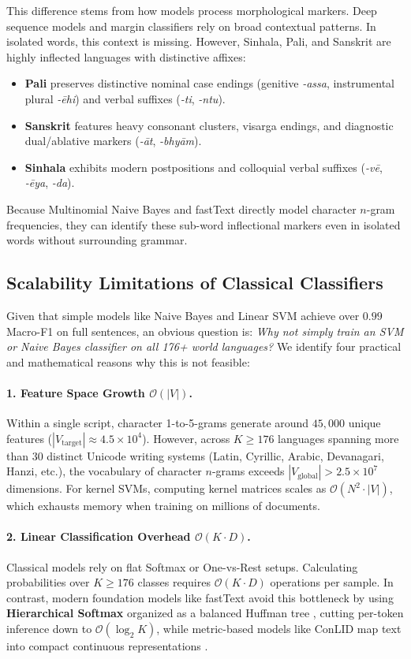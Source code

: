 \documentclass[11pt]{article}
\begin{document}
This difference stems from how models process morphological markers. Deep sequence models and margin classifiers rely on broad contextual patterns. In isolated words, this context is missing. However, Sinhala, Pali, and Sanskrit are highly inflected languages with distinctive affixes:
\begin{itemize}
    \item \textbf{Pali} preserves distinctive nominal case endings (genitive \textit{-assa}, instrumental plural \textit{-\={e}hi}) and verbal suffixes (\textit{-ti}, \textit{-ntu}).
    \item \textbf{Sanskrit} features heavy consonant clusters, visarga endings, and diagnostic dual/ablative markers (\textit{-\={a}t}, \textit{-bhy\={a}m}).
    \item \textbf{Sinhala} exhibits modern postpositions and colloquial verbal suffixes (\textit{-v\={e}}, \textit{-\={e}ya}, \textit{-da}).
\end{itemize}
Because Multinomial Naive Bayes and fastText directly model character $n$-gram frequencies, they can identify these sub-word inflectional markers even in isolated words without surrounding grammar.

\subsection{Scalability Limitations of Classical Classifiers}
Given that simple models like Naive Bayes and Linear SVM achieve over $0.99$ Macro-F1 on full sentences, an obvious question is: \textit{Why not simply train an SVM or Naive Bayes classifier on all 176+ world languages?} We identify four practical and mathematical reasons why this is not feasible:

\paragraph{1. Feature Space Growth $\mathcal{O}(|V|)$.}
Within a single script, character 1-to-5-grams generate around $45,000$ unique features ($|V_{\text{target}}| \approx 4.5 \times 10^4$). However, across $K \ge 176$ languages spanning more than 30 distinct Unicode writing systems (Latin, Cyrillic, Arabic, Devanagari, Hanzi, etc.), the vocabulary of character $n$-grams exceeds $|V_{\text{global}}| > 2.5 \times 10^7$ dimensions. For kernel SVMs, computing kernel matrices scales as $\mathcal{O}(N^2 \cdot |V|)$, which exhausts memory when training on millions of documents.

\paragraph{2. Linear Classification Overhead $\mathcal{O}(K \cdot D)$.}
Classical models rely on flat Softmax or One-vs-Rest setups. Calculating probabilities over $K \ge 176$ classes requires $\mathcal{O}(K \cdot D)$ operations per sample. In contrast, modern foundation models like fastText avoid this bottleneck by using \textbf{Hierarchical Softmax} organized as a balanced Huffman tree \cite{joulin-etal-2017-bag}, cutting per-token inference down to $\mathcal{O}(\log_2 K)$, while metric-based models like ConLID map text into compact continuous representations \cite{foroutan-etal-2026-conlid}.
\end{document}
